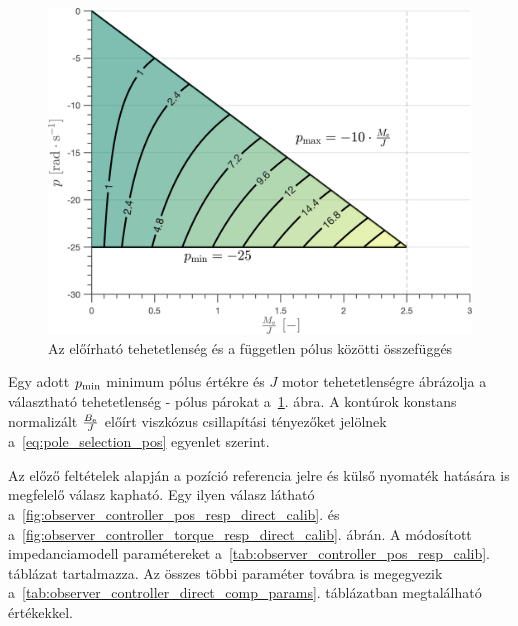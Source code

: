 \begin{figure}[b!]
	\begin{center}
		\includegraphics[height=0.5\textheight]{images/observer_controller_param_limits.png}
		\caption{Az előírható tehetetlenség és a független pólus közötti összefüggés}\label{fig:observer_controller_param_limits}
	\end{center}
\end{figure}
Egy adott \(p_{\mathrm{min}}\) minimum pólus értékre és \(J\) motor tehetetlenségre ábrázolja 
a választható tehetetlenség - pólus párokat a~\ref{fig:observer_controller_param_limits}. ábra.
A kontúrok konstans normalizált \(\frac{B_{\mathrm{e}}}{J}\) előírt viszkózus csillapítási tényezőket jelölnek a~\eqref{eq:pole_selection_pos}
egyenlet szerint.



Az előző feltételek alapján a pozíció referencia jelre és külső nyomaték hatására is megfelelő válasz kapható.
Egy ilyen válasz látható a~\ref{fig:observer_controller_pos_resp_direct_calib}. 
és a~\ref{fig:observer_controller_torque_resp_direct_calib}. ábrán. 
A módosított impedanciamodell paramétereket a~\ref{tab:observer_controller_pos_resp_calib}. táblázat tartalmazza.
Az összes többi paraméter továbra is megegyezik a~\ref{tab:observer_controller_direct_comp_params}. 
táblázatban megtalálható értékekkel. 


